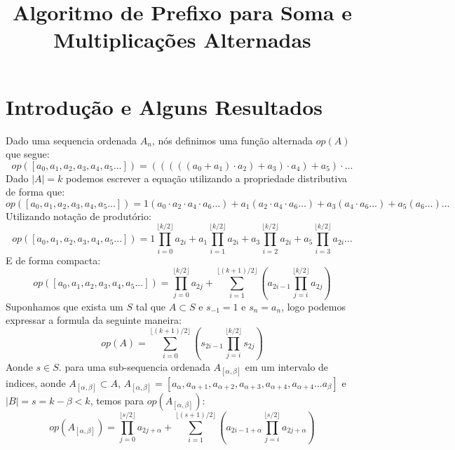 \documentclass{article}
\title{Algoritmo de Prefixo para Soma e Multiplicações Alternadas}
\author{}
\date{}
\begin{document}
\maketitle
\section{Introdução e Alguns Resultados}
Dado uma sequencia ordenada $A_n$, nós definimos uma função alternada $op(A)$ que segue:
\begin{equation}
op([a_0,a_1,a_2,a_3,a_4,a_5...])= (((((a_0+a_1)\cdot a_2)+a_3)\cdot a_4)+a_5)\cdot ...
\end{equation}
Dado $|A|=k$ podemos escrever a equação utilizando a propriedade distributiva de forma que:
\begin{equation}
op([a_0,a_1,a_2,a_3,a_4,a_5...])= 1(a_0 \cdot a_2 \cdot a_4 \cdot a_6 \dots) + a_1 (a_2 \cdot a_4 \cdot a_6 \dots) + a_3 (a_4 \cdot a_6 \dots) + a_ 5 (a_6 \dots) ...
\end{equation}
Utilizando notação de produtório:
\begin{equation}
op([a_0,a_1,a_2,a_3,a_4,a_5...])= 1 \prod_{i=0}^{\lfloor k/2 \rfloor} a_{2i} + a_1 \prod_{i=1}^{\lfloor k/2 \rfloor } a_{2i} + a_3 \prod_{i=2}^{\lfloor k/2 \rfloor} a_{2i} + a_ 5 \prod_{i=3}^{\lfloor k/2 \rfloor} a_{2i} ...
\end{equation}
E de forma compacta:
\begin{equation}
op([a_0,a_1,a_2,a_3,a_4,a_5...])=\prod_{j=0}^{\lfloor k/2 \rfloor } a_{2j} + \sum_{i=1}^{\lfloor (k+1)/2 \rfloor} ( a_{2i-1} \prod_{j=i}^{\lfloor k/2 \rfloor} a_{2j} )
\end{equation}
Suponhamos que exista um $S$ tal que $A \subset S$ e $s_{-1} = 1$ e $s_n=a_n$, logo podemos expressar a formula da seguinte maneira:
\begin{equation}
op(A)=\sum_{i=0}^{\lfloor (k+1)/2 \rfloor} ( s_{2i-1} \prod_{j=i}^{\lfloor k/2 \rfloor} s_{2j} )
\end{equation}
Aonde $s \in S$.
para uma sub-sequencia ordenada $A_{[\alpha, \beta]}$ em um intervalo de indices, aonde $A_{[\alpha, \beta]} \subset A$, $A_{[\alpha, \beta]}= [a_\alpha,a_{\alpha+1},a_{\alpha+2},a_{\alpha+3},a_{\alpha+4},a_{\alpha+4}... a_{\beta}]$ e $|B|= s = k - \beta < k $, temos para $op(A_{[\alpha, \beta]})$:
\begin{equation}
op(A_{[\alpha, \beta]})= \prod_{j=0}^{\lfloor s/2 \rfloor } a_{2j +\alpha} + \sum_{i=1}^{\lfloor (s+1)/2 \rfloor} ( a_{2i-1 +\alpha} \prod_{j=i}^{\lfloor s/2 \rfloor} a_{2j +\alpha} )
\end{equation}
\end{document}
